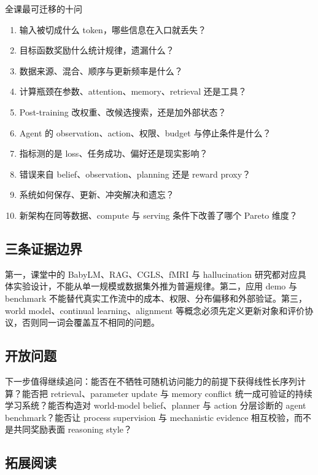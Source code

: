 \documentclass[a4paper]{article}
\begin{document}
\begin{importantbox}{全课最可迁移的十问}
\begin{enumerate}
  \item 输入被切成什么 token，哪些信息在入口就丢失？
  \item 目标函数奖励什么统计规律，遗漏什么？
  \item 数据来源、混合、顺序与更新频率是什么？
  \item 计算瓶颈在参数、attention、memory、retrieval 还是工具？
  \item Post-training 改权重、改候选搜索，还是加外部状态？
  \item Agent 的 observation、action、权限、budget 与停止条件是什么？
  \item 指标测的是 loss、任务成功、偏好还是现实影响？
  \item 错误来自 belief、observation、planning 还是 reward proxy？
  \item 系统如何保存、更新、冲突解决和遗忘？
  \item 新架构在同等数据、compute 与 serving 条件下改善了哪个 Pareto 维度？
\end{enumerate}
\end{importantbox}

\subsection{三条证据边界}

第一，课堂中的 BabyLM、RAG、CGLS、fMRI 与 hallucination 研究都对应具体实验设计，不能从单一规模或数据集外推为普遍规律。第二，应用 demo 与 benchmark 不能替代真实工作流中的成本、权限、分布偏移和外部验证。第三，world model、continual learning、alignment 等概念必须先定义更新对象和评价协议，否则同一词会覆盖互不相同的问题。

\subsection{开放问题}

下一步值得继续追问：能否在不牺牲可随机访问能力的前提下获得线性长序列计算？能否把 retrieval、parameter update 与 memory conflict 统一成可验证的持续学习系统？能否构造对 world-model belief、planner 与 action 分层诊断的 agent benchmark？能否让 process supervision 与 mechanistic evidence 相互校验，而不是共同奖励表面 reasoning style？

\subsection{拓展阅读}
\end{document}
